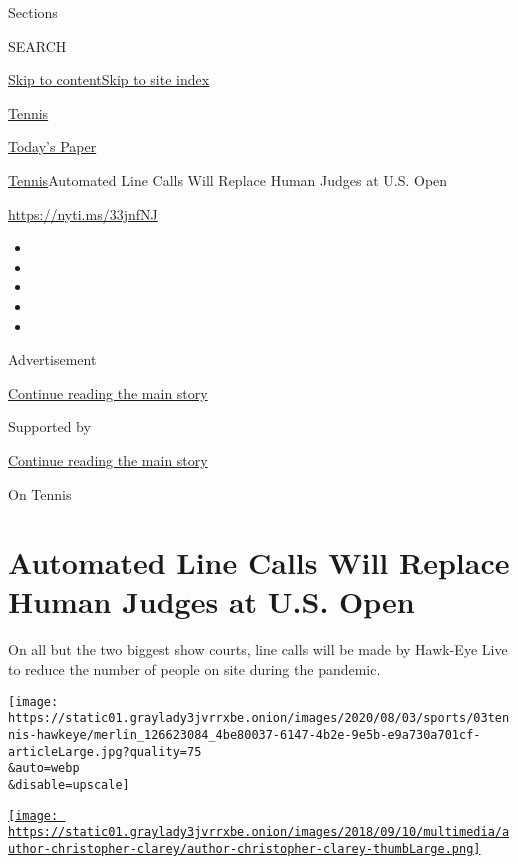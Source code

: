 Sections

SEARCH

\protect\hyperlink{site-content}{Skip to
content}\protect\hyperlink{site-index}{Skip to site index}

\href{https://www.nytimes3xbfgragh.onion/section/sports/tennis}{Tennis}

\href{https://myaccount.nytimes3xbfgragh.onion/auth/login?response_type=cookie\&client_id=vi}{}

\href{https://www.nytimes3xbfgragh.onion/section/todayspaper}{Today's
Paper}

\href{/section/sports/tennis}{Tennis}\textbar{}Automated Line Calls Will
Replace Human Judges at U.S. Open

\url{https://nyti.ms/33jnfNJ}

\begin{itemize}
\item
\item
\item
\item
\item
\end{itemize}

Advertisement

\protect\hyperlink{after-top}{Continue reading the main story}

Supported by

\protect\hyperlink{after-sponsor}{Continue reading the main story}

On Tennis

\hypertarget{automated-line-calls-will-replace-human-judges-at-us-open}{%
\section{Automated Line Calls Will Replace Human Judges at U.S.
Open}\label{automated-line-calls-will-replace-human-judges-at-us-open}}

On all but the two biggest show courts, line calls will be made by
Hawk-Eye Live to reduce the number of people on site during the
pandemic.

\texttt{[image: https://static01.graylady3jvrrxbe.onion/images/2020/08/03/sports/03tennis-hawkeye/merlin\_126623084\_4be80037-6147-4b2e-9e5b-e9a730a701cf-articleLarge.jpg?quality=75\\\&auto=webp\\\&disable=upscale]}

\href{https://www.nytimes3xbfgragh.onion/by/christopher-clarey}{\texttt{[image: https://static01.graylady3jvrrxbe.onion/images/2018/09/10/multimedia/author-christopher-clarey/author-christopher-clarey-thumbLarge.png]}}

